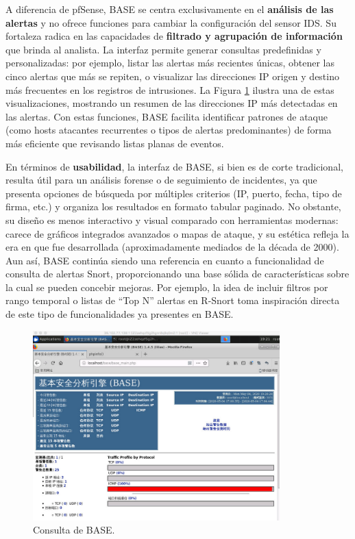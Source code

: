 \documentclass[11pt,a4paper,twoside]{report}
\begin{document}
A diferencia de pfSense, BASE se centra exclusivamente en el \textbf{análisis de las alertas} y no ofrece funciones para cambiar la configuración del sensor IDS. Su fortaleza radica en las capacidades de 
\textbf{filtrado y agrupación de información} que brinda al analista. La interfaz permite generar consultas predefinidas y personalizadas: por ejemplo, listar las alertas más recientes únicas, obtener las cinco alertas que más se repiten, o visualizar las direcciones IP origen y destino más frecuentes en los registros de intrusiones. La Figura \ref{fig:base-stats} ilustra una de estas visualizaciones, mostrando un resumen de las direcciones IP más detectadas en las alertas. Con estas funciones, BASE facilita identificar patrones de ataque (como hosts atacantes recurrentes o tipos de alertas predominantes) de forma más eficiente que revisando listas planas de eventos.\newline

En términos de \textbf{usabilidad}, la interfaz de BASE, si bien es de corte tradicional, resulta útil para un análisis forense o de seguimiento de incidentes, ya que presenta opciones de búsqueda por múltiples criterios (IP, puerto, fecha, tipo de firma, etc.) y organiza los resultados en formato tabular paginado. No obstante, su diseño es menos interactivo y visual comparado con herramientas modernas: carece de gráficos integrados avanzados o mapas de ataque, y su estética refleja la era en que fue desarrollada (aproximadamente mediados de la década de 2000). Aun así, BASE continúa siendo una referencia en cuanto a funcionalidad de consulta de alertas Snort, proporcionando una base sólida de características sobre la cual se pueden concebir mejoras. Por ejemplo, la idea de incluir filtros por rango temporal o listas de “Top N” alertas en R-Snort toma inspiración directa de este tipo de funcionalidades ya presentes en BASE.

\begin{figure}[hbtp]
	\centering
	\includegraphics[width=0.85\textwidth]{documento/2.png}
	\caption{Consulta de BASE.}
	\label{fig:base-stats}
\end{figure}
\end{document}
